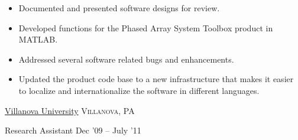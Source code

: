 \documentclass[12pt,a4paper]{article} %
\begin{document}
{{{\begin{itemize}
\item Documented and presented software designs for review.

\item Developed functions for the Phased Array System Toolbox product in MATLAB.

\item Addressed several software related bugs and enhancements.

\item Updated the product code base to a new infrastructure that makes it easier to localize and internationalize the software in different languages. 
\end{itemize}
 }}

}


\headedsection %
{\href{http://www.villanova.edu}{Villanova University}}
{\textsc{ Villanova, PA }} {

\headedsubsection %
{Research Assistant}
{Dec '09 -- July '11}
{}
}


\spacedhrule{-0.2em}{-0.4em} %

\end{document}

